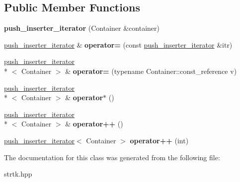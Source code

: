 \subsection*{Public Member Functions}
\begin{DoxyCompactItemize}
\item 
\hypertarget{classstrtk_1_1push__inserter__iterator_a578f5c7cb54edbbb84c1d8d36b490c94}{{\bfseries push\-\_\-inserter\-\_\-iterator} (Container \&container)}\label{classstrtk_1_1push__inserter__iterator_a578f5c7cb54edbbb84c1d8d36b490c94}

\item 
\hypertarget{classstrtk_1_1push__inserter__iterator_ad251d0a2f0e580aa3d19f5334fba9a85}{\hyperlink{classstrtk_1_1push__inserter__iterator}{push\-\_\-inserter\-\_\-iterator} \& {\bfseries operator=} (const \hyperlink{classstrtk_1_1push__inserter__iterator}{push\-\_\-inserter\-\_\-iterator} \&itr)}\label{classstrtk_1_1push__inserter__iterator_ad251d0a2f0e580aa3d19f5334fba9a85}

\item 
\hypertarget{classstrtk_1_1push__inserter__iterator_aaa01d8f8bbe3f31ff9458000474964ae}{\hyperlink{classstrtk_1_1push__inserter__iterator}{push\-\_\-inserter\-\_\-iterator}\\*
$<$ Container $>$ \& {\bfseries operator=} (typename Container\-::const\-\_\-reference v)}\label{classstrtk_1_1push__inserter__iterator_aaa01d8f8bbe3f31ff9458000474964ae}

\item 
\hypertarget{classstrtk_1_1push__inserter__iterator_a44ef1eb80f538f200bdb865a9ff40c32}{\hyperlink{classstrtk_1_1push__inserter__iterator}{push\-\_\-inserter\-\_\-iterator}\\*
$<$ Container $>$ \& {\bfseries operator$\ast$} ()}\label{classstrtk_1_1push__inserter__iterator_a44ef1eb80f538f200bdb865a9ff40c32}

\item 
\hypertarget{classstrtk_1_1push__inserter__iterator_a1487f29071a3e248e9ee59b47d2e7b65}{\hyperlink{classstrtk_1_1push__inserter__iterator}{push\-\_\-inserter\-\_\-iterator}\\*
$<$ Container $>$ \& {\bfseries operator++} ()}\label{classstrtk_1_1push__inserter__iterator_a1487f29071a3e248e9ee59b47d2e7b65}

\item 
\hypertarget{classstrtk_1_1push__inserter__iterator_a03846ef51510282effffe5c55b213a4d}{\hyperlink{classstrtk_1_1push__inserter__iterator}{push\-\_\-inserter\-\_\-iterator}$<$ Container $>$ {\bfseries operator++} (int)}\label{classstrtk_1_1push__inserter__iterator_a03846ef51510282effffe5c55b213a4d}

\end{DoxyCompactItemize}


The documentation for this class was generated from the following file\-:\begin{DoxyCompactItemize}
\item 
strtk.\-hpp\end{DoxyCompactItemize}
